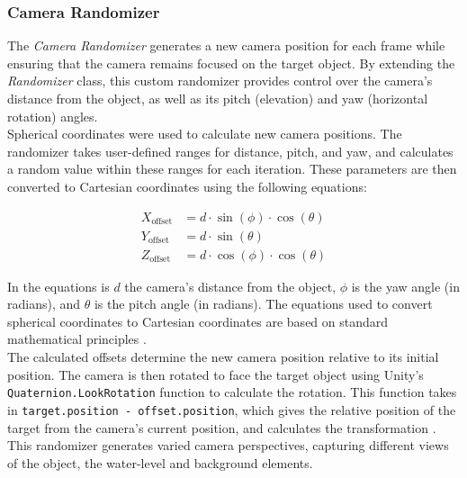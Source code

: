 \subsubsection{Camera Randomizer}
The \textit{Camera Randomizer} generates a new camera position for each frame while ensuring that the camera remains focused on the target object. By extending the \textit{Randomizer} class, this custom randomizer provides control over the camera's distance from the object, as well as its pitch (elevation) and yaw (horizontal rotation) angles. \\

\noindent Spherical coordinates were used to calculate new camera positions. The randomizer takes user-defined ranges for distance, pitch, and yaw, and calculates a random value within these ranges for each iteration. These parameters are then converted to Cartesian coordinates using the following equations:

\begin{align}
X_{\text{offset}} &= d \cdot \sin(\phi) \cdot \cos(\theta) \\
Y_{\text{offset}} &= d \cdot \sin(\theta) \\
Z_{\text{offset}} &= d \cdot \cos(\phi) \cdot \cos(\theta)
\end{align}

\noindent In the equations is \(d\) the camera's distance from the object, \(\phi\) is the yaw angle (in radians), and \(\theta\) is the pitch angle (in radians). The equations used to convert spherical coordinates to Cartesian coordinates are based on standard mathematical principles \cite{wolfram_spherical_coordinates}.\\

\noindent The calculated offsets determine the new camera position relative to its initial position. The camera is then rotated to face the target object using Unity's \texttt{Quaternion.LookRotation} function to calculate the rotation. This function takes in \texttt{target.position - offset.position}, which gives the relative position of the target from the camera's current position, and calculates the transformation \cite{unity_quaternion_lookrotation}. This randomizer generates varied camera perspectives, capturing different views of the object, the water-level and background elements.

